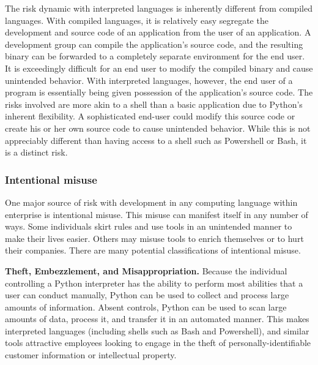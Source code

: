                                 The risk dynamic with interpreted languages is inherently different from compiled languages. With compiled languages, it is relatively easy segregate the development and source code of an application from the user of an application. A development group can compile the application's source code, and the resulting binary can be forwarded to a completely separate environment for the end user. It is exceedingly difficult for an end user to modify the compiled binary and cause unintended behavior. With interpreted languages, however, the end user of a program is essentially being given possession of the application's source code. The risks involved are more akin to a shell than a basic application due to Python's inherent flexibility. A sophisticated end-user could modify this source code or create his or her own source code to cause unintended behavior. While this is not appreciably different than having access to a shell such as Powershell or Bash, it is a distinct risk.
 
                                \subsubsection{Intentional misuse}
 
                                                One major source of risk with development in any computing language within enterprise is intentional misuse. This misuse can manifest itself in any number of ways. Some individuals skirt rules and use tools in an unintended manner to make their lives easier. Others may misuse tools to enrich themselves or to hurt their companies. There are many potential classifications of intentional misuse.
 
                                                \textbf{Theft, Embezzlement, and Misappropriation.}
                                                Because the individual controlling a Python interpreter has the ability to perform most abilities that a user can conduct manually, Python can be used to collect and process large amounts of information. Absent controls, Python can be used to scan large amounts of data, process it, and transfer it in an automated manner. This makes interpreted languages (including shells such as Bash and Powershell), and similar tools attractive employees looking to engage in the theft of personally-identifiable customer information or intellectual property.
 
